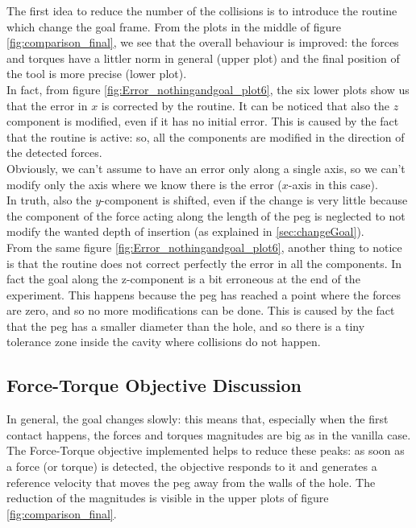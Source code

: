 The first idea to reduce the number of the collisions is to introduce the routine which change the goal frame. From the plots in the middle of figure \ref{fig:comparison_final}, we see that the overall behaviour is improved: the forces and torques have a littler norm in general (upper plot) and the final position of the tool is more precise (lower plot).\\

In fact, from figure \ref{fig:Error_nothingandgoal_plot6}, the six lower plots show us that the error in $x$ is corrected by the routine. It can be noticed that also the $z$ component is modified, even if it has no initial error. This is caused by the fact that the routine is active: so, all the components are modified in the direction of the detected forces.\\
Obviously, we can't assume to have an error only along a single axis, so we can't modify only the axis where we know there is the error ($x$-axis in this case).\\
In truth, also the \mbox{$y$-component} is shifted, even if the change is very little because the component of the force acting along the length of the peg is neglected to not modify the wanted depth of insertion (as explained in \ref{sec:changeGoal}).\\

From the same figure \ref{fig:Error_nothingandgoal_plot6}, another thing to notice is that the routine does not correct perfectly the error in all the components. In fact the goal along the z-component is a bit erroneous at the end of the experiment. This happens because the peg has reached a point where the forces are zero, and so no more modifications can be done. This is caused by the fact that the peg has a smaller diameter than the hole, and so there is a tiny tolerance zone inside the cavity where collisions do not happen.\\

\subsection{Force-Torque Objective Discussion}
In general, the goal changes slowly: this means that, especially when the first contact happens, the forces and torques magnitudes are big as in the vanilla case.\\
The Force-Torque objective implemented helps to reduce these peaks: as soon as a force (or torque) is detected, the objective responds to it and generates a reference velocity that moves the peg away from the walls of the hole. The reduction of the magnitudes is visible in the upper plots of figure \ref{fig:comparison_final}. \\


